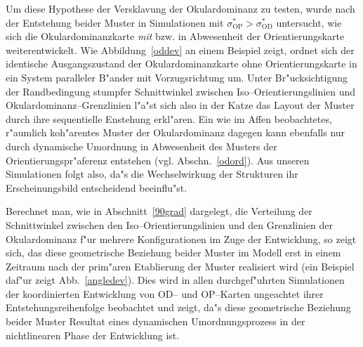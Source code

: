 Um diese Hypothese der Versklavung der Okulardominanz zu testen, wurde nach
der Entstehung beider Muster in Simulationen mit
$\sigma^\ast_{\text{OP}}>\sigma^\ast_{\text{OD}}$ untersucht, wie sich die
Okulardominanzkarte \emph{mit} bzw. in Abwesenheit der Orientierungskarte
weiterentwickelt. Wie Abbildung~\ref{oddev} an einem Beispiel zeigt, ordnet
sich der identische Ausgangszustand der Okulardominanzkarte ohne
Orientierungskarte in ein System paralleler B"ander mit Vorzugsrichtung um.
Unter Br"ucksichtigung der Randbedingung stumpfer Schnittwinkel zwischen
Iso--Orientierungslinien und Okulardominanz--Grenzlinien l"a"st sich also
in der Katze das Layout der Muster durch ihre sequentielle Enstehung
erkl"aren.  Ein wie im Affen beobachtetes, r"aumlich koh"arentes Muster der
Okulardominanz dagegen kann ebenfalls nur durch dynamische Umordnung in
Abwesenheit des Musters der Orientierungspr"aferenz entstehen
(vgl. Abschn.~\ref{odord}).  Aus unseren Simulationen folgt also, da"s die
Wechselwirkung der Strukturen ihr Erscheinungsbild entscheidend
beeinflu"st.

Berechnet man, wie in Abschnitt~\ref{90grad} dargelegt, die Verteilung der
Schnittwinkel zwischen den Iso--Orientierungslinien und den Grenzlinien der
Okulardominanz f"ur mehrere Konfigurationen im Zuge der Entwicklung, so
zeigt sich, das diese geometrische Beziehung beider Muster im Modell erst
in einem Zeitraum nach der prim"aren Etablierung der Muster realisiert
wird (ein Beispiel daf"ur zeigt Abb.~\ref{angledev}).  Dies wird in allen
durchgef"uhrten Simulationen der koordinierten Entwicklung von OD-- und
OP--Karten ungeachtet ihrer Entstehungsreihenfolge beobachtet und zeigt,
da"s diese geometrische Beziehung beider Muster Resultat eines dynamischen
Umordnungsprozess in der nichtlinearen Phase der Entwicklung ist.
